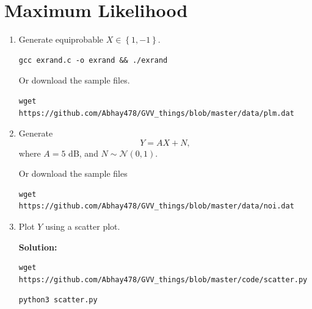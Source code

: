 \documentclass[journal,12pt,twocolumn]{IEEEtran}
\renewcommand\thesection{\arabic{section}}
\providecommand{\cbrak}[1]{\ensuremath{\left\{#1\right\}}}
\theoremstyle{remark}
\providecommand{\gauss}[2]{\mathcal{N}\ensuremath{\left(#1,#2\right)}}
\newcommand{\solution}{\noindent \textbf{Solution: }}
\numberwithin{equation}{section}
\numberwithin{equation}{section}
\begin{document}
\section{Maximum Likelihood}
\begin{enumerate}[label=\thesection.\arabic*, ref=\thesection.\theenumi]
\item Generate equiprobable $X \in \cbrak{1,-1}$.

        
    \begin{lstlisting}
gcc exrand.c -o exrand && ./exrand
    \end{lstlisting}

    Or download the sample files.
\begin{lstlisting}
wget https://github.com/Abhay478/GVV_things/blob/master/data/plm.dat
\end{lstlisting}
\item Generate 
\begin{equation}
Y = AX+N,
\end{equation}
		where $A = 5$ dB,  and $N \sim \gauss{0}{1}$.

Or download the sample files
\begin{lstlisting}
wget https://github.com/Abhay478/GVV_things/blob/master/data/noi.dat
\end{lstlisting}
    
	\item Plot $Y$ using a scatter plot.
	
	\solution

    \begin{lstlisting}
wget https://github.com/Abhay478/GVV_things/blob/master/code/scatter.py
    \end{lstlisting}

    \begin{lstlisting}
python3 scatter.py
    \end{lstlisting}
	

\end{enumerate}
\end{document}
